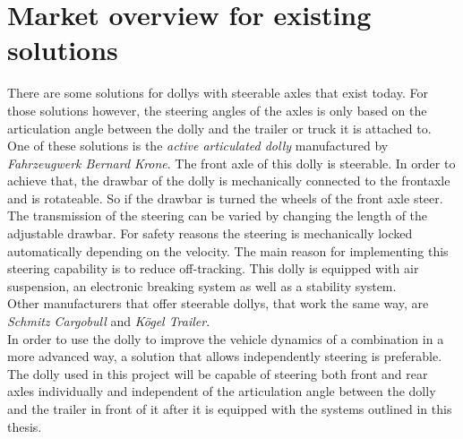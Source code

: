 \documentclass[ExampleMasters.tex]{subfiles}
\begin{document}

\section{Market overview for existing solutions}
\label{sec:market_overview}
There are some solutions for dollys with steerable axles that exist today. For those solutions however, the steering angles of the axles is only based on the articulation angle between the dolly and the trailer or truck it is attached to. \\
One of these solutions is the \textit{active articulated dolly} manufactured by \textit{Fahrzeugwerk Bernard Krone}. The front axle of this dolly is steerable. In order to achieve that, the drawbar of the dolly is mechanically connected to the frontaxle and is rotateable. So if the drawbar is turned the wheels of the front axle steer. The transmission of the steering can be varied by changing the length of the adjustable drawbar. For safety reasons the steering is mechanically locked automatically depending on the velocity. The main reason for implementing this steering capability is to reduce off-tracking. This dolly is equipped with air suspension, an electronic breaking system as well as a stability system\cite{Krone_dolly}. \\
Other manufacturers that offer steerable dollys, that work the same way, are \textit{Schmitz Cargobull} and \textit{K{\"o}gel Trailer}\cite{Kogel_dolly}\cite{Schmitz_dolly}. \\
In order to use the dolly to improve the vehicle dynamics of a  combination in a more advanced way, a solution that allows independently steering is preferable. The dolly used in this project will be capable of steering both front and rear axles individually and independent of the articulation angle between the dolly and the trailer in front of it after it is equipped with the systems outlined in this thesis.
\end{document}
